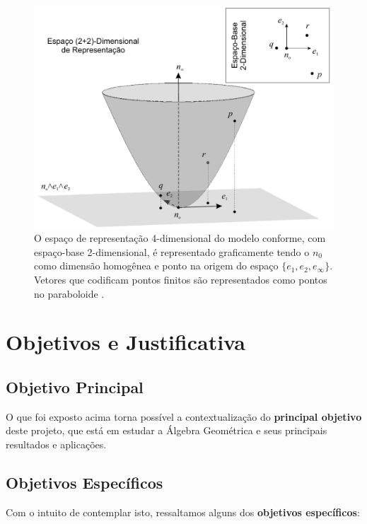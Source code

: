 \documentclass[11pt]{article}
\begin{document}
\begin{figure}[H]
	\begin{center}
		\includegraphics[width=0.75\linewidth]{figures/conforme.png}
	\end{center}
	\caption{O espaço de representação 4-dimensional do modelo conforme, com espaço-base 2-dimensional, é representado graficamente tendo o $n_0$ como dimensão homogênea e ponto na origem do espaço $\{e_1, e_2, e_\infty\}$. Vetores que codificam pontos finitos são representados como pontos no paraboloide \cite{leandro2017algebra}.}
	\label{fig:conforme}
\end{figure}


\section{Objetivos e Justificativa} \label{aims}


\subsection{Objetivo Principal}

O que foi exposto acima torna possível a contextualização do {\bf principal objetivo} deste projeto, que está em estudar a Álgebra Geométrica e seus principais resultados e aplicações. 

\subsection{Objetivos Específicos}

Com o intuito de contemplar isto, ressaltamos alguns dos {\bf objetivos específicos}:
\end{document}
